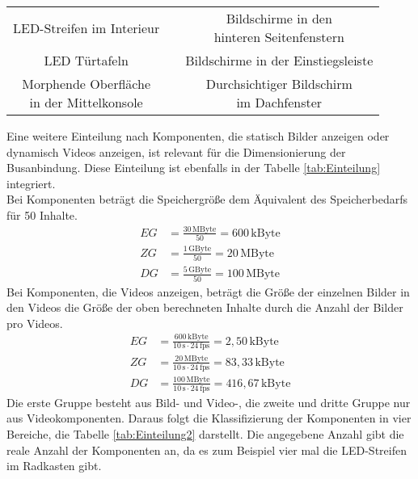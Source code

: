 \begin{table}[hbt]
\begin{tabular}{c|c|c}
		\parbox[t]{0.3\linewidth}{\centering LED-Streifen im Interieur} &  & \parbox[t]{0.3\linewidth}{\centering Bildschirme in den\\hinteren Seitenfenstern} \\
		\parbox[t]{0.3\linewidth}{\centering LED Türtafeln} & & \parbox[t]{0.3\linewidth}{\centering  Bildschirme in der Einstiegsleiste} \\
		\parbox[t]{0.3\linewidth}{\centering Morphende Oberfläche\\in der Mittelkonsole} & & \parbox[t]{0.3\linewidth}{\centering Durchsichtiger Bildschirm\\im Dachfenster} \\
	\end{tabular} 
\end{table}

Eine weitere Einteilung nach Komponenten, die statisch Bilder anzeigen oder dynamisch Videos anzeigen, ist relevant für die Dimensionierung der Busanbindung. Diese Einteilung ist ebenfalls in der Tabelle \ref{tab:Einteilung} integriert. \\
Bei Komponenten beträgt die Speichergröße dem Äquivalent des Speicherbedarfs für 50 Inhalte.
\begin{align}
	EG &= \frac{30\,\mathrm{MByte}}{50} = 600\,\mathrm{kByte} \\
	ZG &= \frac{1\,\mathrm{GByte}}{50} =  20\,\mathrm{MByte} \\
	DG &= \frac{5\,\mathrm{GByte}}{50} = 100\,\mathrm{MByte}
\end{align}
Bei Komponenten, die Videos anzeigen, beträgt die Größe der einzelnen Bilder in den Videos die Größe der oben berechneten Inhalte durch die Anzahl der Bilder pro Videos.
\begin{align}
	EG &= \frac{600\,\mathrm{kByte}}{10\,\mathrm{s} \cdot 24\,\mathrm{fps}} = 2,50\,\mathrm{kByte} \\
	ZG &= \frac{20\,\mathrm{MByte}}{10\,\mathrm{s} \cdot 24\,\mathrm{fps}} = 83,33\,\mathrm{kByte} \\
	DG &= \frac{100\,\mathrm{MByte}}{10\,\mathrm{s} \cdot 24\,\mathrm{fps}} = 416,67\,\mathrm{kByte}
\end{align}
Die erste Gruppe besteht aus Bild- und Video-, die zweite und dritte Gruppe nur aus Videokomponenten. Daraus folgt die Klassifizierung der Komponenten in vier Bereiche, die Tabelle \ref{tab:Einteilung2} darstellt. Die angegebene Anzahl gibt die reale Anzahl der Komponenten an, da es zum Beispiel vier mal die LED-Streifen im Radkasten gibt.
